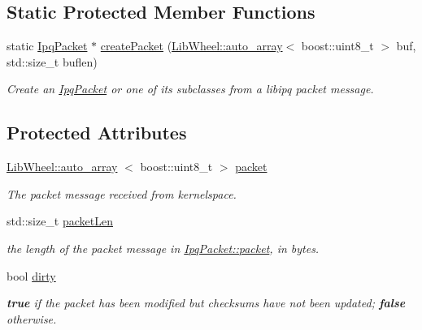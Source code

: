 \subsection*{\-Static \-Protected \-Member \-Functions}
\begin{DoxyCompactItemize}
\item 
static \hyperlink{classIPQ_1_1IpqPacket}{\-Ipq\-Packet} $\ast$ \hyperlink{classIPQ_1_1IpqPacket_adf6099052730113814e9fe7312ec7b8c}{create\-Packet} (\hyperlink{classLibWheel_1_1auto__array}{\-Lib\-Wheel\-::auto\-\_\-array}$<$ boost\-::uint8\-\_\-t $>$ buf, std\-::size\-\_\-t buflen)
\begin{DoxyCompactList}\small\item\em \-Create an \hyperlink{classIPQ_1_1IpqPacket}{\-Ipq\-Packet} or one of its subclasses from a libipq packet message. \end{DoxyCompactList}\end{DoxyCompactItemize}
\subsection*{\-Protected \-Attributes}
\begin{DoxyCompactItemize}
\item 
\hyperlink{classLibWheel_1_1auto__array}{\-Lib\-Wheel\-::auto\-\_\-array}\*
$<$ boost\-::uint8\-\_\-t $>$ \hyperlink{classIPQ_1_1IpqPacket_a2bdf247f13a3e9f86e9e3846e6a9cb45}{packet}
\begin{DoxyCompactList}\small\item\em \-The packet message received from kernelspace. \end{DoxyCompactList}\item 
std\-::size\-\_\-t \hyperlink{classIPQ_1_1IpqPacket_a9b448a070c5ae499e32d2af5a190b86d}{packet\-Len}
\begin{DoxyCompactList}\small\item\em the length of the packet message in \hyperlink{classIPQ_1_1IpqPacket_a2bdf247f13a3e9f86e9e3846e6a9cb45}{\-Ipq\-Packet\-::packet}, in bytes. \end{DoxyCompactList}\item 
bool \hyperlink{classIPQ_1_1IpqPacket_a00acebf51531043a8536f20bb9412d61}{dirty}
\begin{DoxyCompactList}\small\item\em {\bfseries true} if the packet has been modified but checksums have not been updated; {\bfseries false} otherwise. \end{DoxyCompactList}\end{DoxyCompactItemize}
